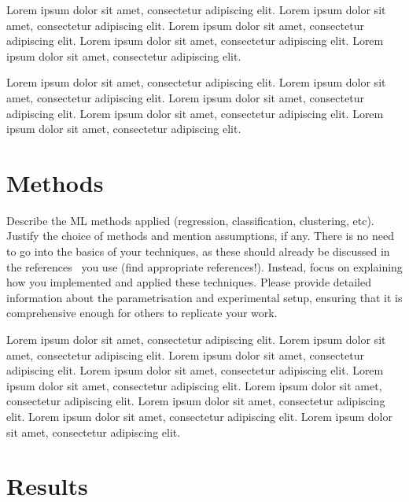 \documentclass[english]{article}
\begin{document}
Lorem ipsum dolor sit amet, consectetur adipiscing elit.
Lorem ipsum dolor sit amet, consectetur adipiscing elit. 
Lorem ipsum dolor sit amet, consectetur adipiscing elit. 
Lorem ipsum dolor sit amet, consectetur adipiscing elit. 
Lorem ipsum dolor sit amet, consectetur adipiscing elit. 

Lorem ipsum dolor sit amet, consectetur adipiscing elit. 
Lorem ipsum dolor sit amet, consectetur adipiscing elit. 
Lorem ipsum dolor sit amet, consectetur adipiscing elit. 
Lorem ipsum dolor sit amet, consectetur adipiscing elit. 
Lorem ipsum dolor sit amet, consectetur adipiscing elit. 

\section{Methods}
Describe the ML methods applied (regression, classification, clustering, etc).
Justify the choice of methods and mention assumptions, if any.
There is no need to go into the basics of your techniques, as these should already be discussed in the references~\cite{foucault2000order} you use (find appropriate references!). Instead, focus on explaining how you implemented and applied these techniques. Please provide detailed information about the parametrisation and experimental setup, ensuring that it is comprehensive enough for others to replicate your work.

Lorem ipsum dolor sit amet, consectetur adipiscing elit.
Lorem ipsum dolor sit amet, consectetur adipiscing elit. 
Lorem ipsum dolor sit amet, consectetur adipiscing elit. 
Lorem ipsum dolor sit amet, consectetur adipiscing elit. 
Lorem ipsum dolor sit amet, consectetur adipiscing elit. 
Lorem ipsum dolor sit amet, consectetur adipiscing elit. 
Lorem ipsum dolor sit amet, consectetur adipiscing elit. 
Lorem ipsum dolor sit amet, consectetur adipiscing elit. 
Lorem ipsum dolor sit amet, consectetur adipiscing elit. 

\section{Results}
\end{document}
